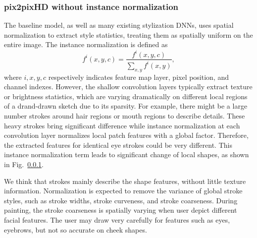 

\subsubsection{pix2pixHD without instance normalization}
The baseline model, as well as many existing stylization DNNs, uses spatial normalization  to extract style statistics, treating them as spatially uniform on the entire image. 
The instance normalization is defined as
\begin{equation}\label{eq:instance-norm}
f^i(x,y,c)=\frac{f^i(x,y,c)}{\sum_{x,y}f^i(x,y)},
\end{equation}
where $i, x,y,c$ respectively indicates feature map layer, pixel position, and channel indexes.  
However, the shallow convolution layers typically extract texture or brightness statistics, which are varying dramatically on different local regions of a drand-drawn sketch due to its sparsity. For example, there might be a large number strokes around hair regions or mouth regions to describe details. These heavy strokes bring significant difference while instance normalization at each convolution layer normalizes local patch features with a global factor. Therefore, the extracted features for identical eye strokes could be very different. 
This instance normalization term leads to significant change of local shapes, as shown in Fig.~\ref{}.


We think that strokes mainly describe the shape features, without little texture information. Normalization is expected to remove the variance of global stroke styles, such as stroke widths, stroke curveness, and stroke coarseness. 
During painting, the stroke coarseness is spatially varying when user depict different facial features. 
The user may draw very carefully for features such as eyes, eyebrows, but not so accurate on cheek shapes. 




%






